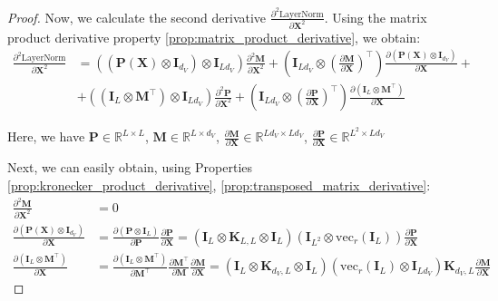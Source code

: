 \documentclass{article}
\begin{document}
\begin{proof}
    Now, we calculate the second derivative $\frac{\partial^2\text{LayerNorm}}{\partial \mathbf{X}^2}$. Using the matrix product derivative property \ref{prop:matrix_product_derivative}, we obtain:
\begin{align*}
    \frac{\partial^2\text{LayerNorm}}{\partial \mathbf{X}^2} &= \left( (\mathbf{P}(\mathbf{X})  \otimes  \mathbf{I}_{d_V}) \otimes \mathbf{I}_{Ld_V} \right)\frac{\partial^2 \mathbf{M}}{\partial \mathbf{X}^2} + \left( \mathbf{I}_{Ld_V} \otimes  (\frac{\partial \mathbf{M}}{\partial \mathbf{X}})^\top \right) \frac{\partial (\mathbf{P}(\mathbf{X}) \otimes \mathbf{I}_{d_V})}{\partial \mathbf{X}} + \\
    &+ \left( (\mathbf{I}_L \otimes \mathbf{M}^\top ) \otimes \mathbf{I}_{L d_V}  \right) \frac{\partial^2 \mathbf{P}}{\partial \mathbf{X}^2} + \left( \mathbf{I}_{L d_V} \otimes (\frac{\partial \mathbf{P}}{\partial \mathbf{X}})^\top \right) \frac{\partial (\mathbf{I}_L \otimes \mathbf{M}^\top )}{\partial\mathbf{X}}
\end{align*}

Here, we have $\mathbf{P} \in \mathbb{R}^{L \times L}$, $\mathbf{M} \in \mathbb{R}^{L \times d_V}$, $\frac{\partial \mathbf{M}}{\partial \mathbf{X}} \in \mathbb{R}^{Ld_V \times Ld_V}$, $\frac{\partial \mathbf{P}}{\partial \mathbf{X}} \in \mathbb{R}^{L^2 \times Ld_V}$

Next, we can easily obtain, using Properties \ref{prop:kronecker_product_derivative}, \ref{prop:transposed_matrix_derivative}: 
\begin{align*}
    \frac{\partial^2 \mathbf{M}}{\partial \mathbf{X}^2} &= 0 \\
    \frac{\partial (\mathbf{P}(\mathbf{X}) \otimes \mathbf{I}_{d_V} )}{\partial \mathbf{X}} &= \frac{\partial (\mathbf{P} \otimes \mathbf{I}_L)}{\partial \mathbf{P}} \frac{\partial \mathbf{P}}{\partial\mathbf{X}} = \left(\mathbf{I}_L \otimes \mathbf{K}_{L, L} \otimes \mathbf{I}_L \right) \left(\mathbf{I}_{L^2} \otimes  \mathrm{vec}_r(\mathbf{I}_L)  \right) \frac{\partial \mathbf{P}}{\partial \mathbf{X}} \\
    \frac{\partial (\mathbf{I}_L \otimes \mathbf{M}^\top )}{\partial\mathbf{X}} &= \frac{\partial ( \mathbf{I}_L \otimes \mathbf{M}^\top)}{\partial \mathbf{M}^\top} \frac{\partial \mathbf{M}^\top}{\partial \mathbf{M}} \frac{\partial \mathbf{M}}{\partial \mathbf{X}} = \left(\mathbf{I}_{L} \otimes \mathbf{K}_{d_V,L} \otimes \mathbf{I}_L \right) \left(\mathrm{vec}_r(\mathbf{I}_L) \otimes  \mathbf{I}_{L d_V} \right) \mathbf{K}_{d_V, L} \frac{\partial \mathbf{M}}{\partial \mathbf{X}}
\end{align*}


\end{proof}
\end{document}
